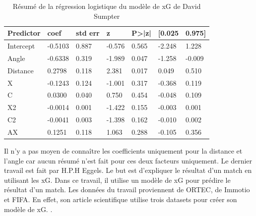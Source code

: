 \documentclass[12pt]{article}
\begin{document}
\begin{table}[htp]
    \centering
    \begin{tabular}{|l|l|l|l|l|l|l|}
    \hline
    \textbf{Predictor} & \textbf{coef} & \textbf{std err} & \textbf{z} & \textbf{P\textgreater{}|z|} & \textbf{{[}0.025} & \textbf{0.975{]}} \\ \hline
    Intercept          & -0.5103       & 0.887            & -0.576     & 0.565                       & -2.248            & 1.228             \\ \hline
    Angle              & -0.6338       & 0.319            & -1.989     & 0.047                       & -1.258            & -0.009            \\ \hline
    Distance           & 0.2798        & 0.118            & 2.381      & 0.017                       & 0.049             & 0.510             \\ \hline
    X                  & -0.1243       & 0.124            & -1.001     & 0.317                       & -0.368            & 0.119             \\ \hline
    C                  & 0.0300        & 0.040            & 0.750      & 0.454                       & -0.048            & 0.109             \\ \hline
    X2                 & -0.0014       & 0.001            & -1.422     & 0.155                       & -0.003            & 0.001             \\ \hline
    C2                 & -0.0041       & 0.003            & -1.398     & 0.162                       & -0.010            & 0.002             \\ \hline
    AX                 & 0.1251        & 0.118            & 1.063      & 0.288                       & -0.105            & 0.356             \\ \hline
    \end{tabular}
    \caption{Résumé de la régression logistique du modèle de xG de David Sumpter}
\end{table}
Il n'y a pas moyen de connaître les coefficients uniquement pour la distance et l'angle car aucun résumé n'est fait pour ces deux facteurs uniquement.
\newline\newline
Le dernier travail est fait par H.P.H Eggels. 
Le but est d'expliquer le résultat d'un match en utilisant les xG. 
Dans ce travail, il utilise un modèle de xG pour prédire le résultat d'un match.
Les données du travail proviennent de ORTEC, de Immotio et FIFA. En effet, son article scientifique utilise trois datasets pour créer son modèle de xG. \cite{eggelsExpectedGoalsSoccer2016}.
\end{document}
